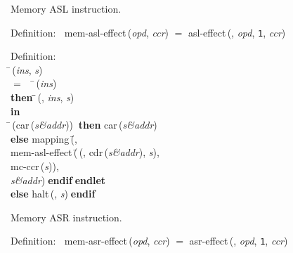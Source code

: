  Memory ASL instruction.
\begin{tabbing}{\sc Definition}:$\;\;$
{\rm{mem-asl-effect}}\,({\it{opd\/}}, {\it{ccr\/}}) $=$ {\rm{asl-effect}}\,({}, {\it{opd\/}}, {\tt{1}}, {\it{ccr\/}})
\end{tabbing}

\begin{tabbing}{\sc Definition}: \\  
\=\,({\it{ins\/}}, {\it{s\/}}) \\ 
$=$$\;\;\;\;$\=\,({\it{ins\/}}) \\ 
{\bf then }\=\=\,({}, {\it{ins\/}}, {\it{s\/}})\- \\ 
{\bf in} \\ 
\=\,({\rm{car}}\,({\it{s\&addr\/}}))$\;\;${\bf then }{\rm{car}}\,({\it{s\&addr\/}}) \\ 
{\bf else }{\rm{mapping}}\,(\=, \\ 
{\rm{mem-asl-effect}}\,(\=\,({}, {\rm{cdr}}\,({\it{s\&addr\/}}), {\it{s\/}}), \\ 
{\rm{mc-ccr}}\,({\it{s\/}}))\-, \\ 
{\it{s\&addr\/}})\-$\;${\bf  endif}\-$\;${\bf  endlet}\- \\ 
{\bf else }{\rm{halt}}\,({}, {\it{s\/}})$\;${\bf  endif}\-\-
\end{tabbing}

 Memory ASR instruction.
\begin{tabbing}{\sc Definition}:$\;\;$
{\rm{mem-asr-effect}}\,({\it{opd\/}}, {\it{ccr\/}}) $=$ {\rm{asr-effect}}\,({}, {\it{opd\/}}, {\tt{1}}, {\it{ccr\/}})
\end{tabbing}

